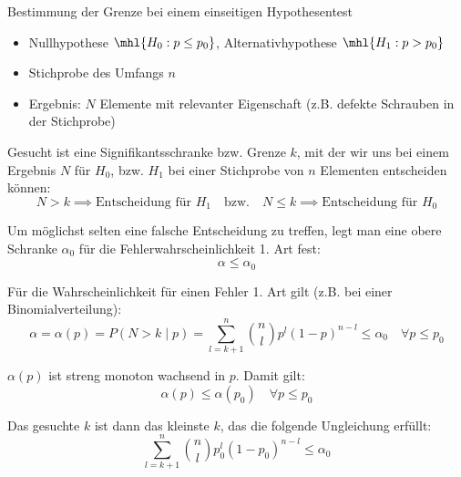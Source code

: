 \begin{algo}{Bestimmung der Grenze bei einem einseitigen Hypothesentest}
    \begin{itemize}
        \item Nullhypothese $\mhl{H_0: p \leq p_0}$, Alternativhypothese $\mhl{H_1: p > p_0}$
        \item Stichprobe des Umfangs $n$
        \item Ergebnis: $N$ Elemente mit relevanter Eigenschaft (z.B. defekte Schrauben in der Stichprobe)
    \end{itemize}

    Gesucht ist eine Signifikantsschranke bzw. Grenze $k$, mit der wir uns bei einem Ergebnis $N$ für $H_0$, bzw. $H_1$ bei einer Stichprobe von $n$ Elementen entscheiden können:
    \[
        N > k \implies \text{Entscheidung für $H_1$} \quad \text{bzw.} \quad N \leq k \implies \text{Entscheidung für $H_0$}
    \]

    Um möglichst selten eine falsche Entscheidung zu treffen, legt man eine obere Schranke $\alpha_0$ für die Fehlerwahrscheinlichkeit 1. Art fest:
    \[
        \alpha \leq \alpha_0
    \]

    Für die Wahrscheinlichkeit für einen Fehler 1. Art gilt (z.B. bei einer Binomialverteilung):
    \[
        \alpha = \alpha(p) = P(N > k \mid p) = \sum_{l=k+1}^n \binom{n}{l} p^l (1-p)^{n-l} \leq \alpha_0 \quad \forall p \leq p_0
    \]

    $\alpha(p)$ ist streng monoton wachsend in $p$.
    Damit gilt:
    \[
        \alpha(p) \leq \alpha(p_0) \quad \forall p \leq p_0
    \]

    Das gesuchte $k$ ist dann das kleinste $k$, das die folgende Ungleichung erfüllt:
    \[
        \sum_{l=k+1}^n \binom{n}{l} p_0^l (1-p_0)^{n-l} \leq \alpha_0
    \]

\end{algo}

